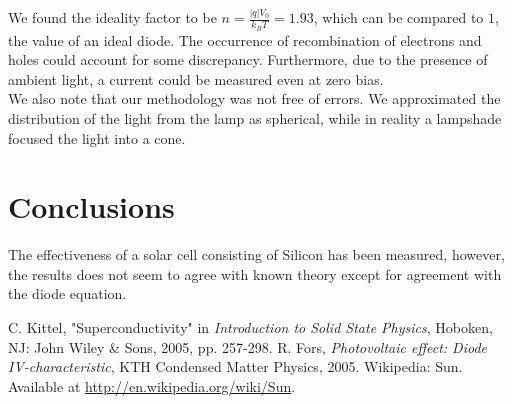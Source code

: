 \documentclass[12pt,a4paper]{article}
\begin{document}
We found the ideality factor to be $n = \frac{|q|V_0}{k_BT} = 1.93$, which can be compared to $1$, the value of an ideal diode. The occurrence of recombination of electrons and holes could account for some discrepancy. Furthermore, due to the presence of ambient light, a current could be measured even at zero bias. \\

We also note that our methodology was not free of errors. We approximated the distribution of the light from the lamp as spherical, while in reality a lampshade focused the light into a cone.

\section{Conclusions}
The effectiveness of a solar cell consisting of Silicon has been measured, however, the results does not seem to agree with known theory except for agreement with the diode equation.
\begin{thebibliography}{9}
 C. Kittel, "Superconductivity" in \emph{Introduction to Solid State Physics}, Hoboken, NJ: John Wiley \& Sons, 2005, pp. 257-298.
 R. Fors, \emph{Photovoltaic effect: Diode IV-characteristic}, KTH Condensed Matter Physics, 2005.
 Wikipedia: Sun. Available at \url{http://en.wikipedia.org/wiki/Sun}.
\end{thebibliography}
\end{document}
